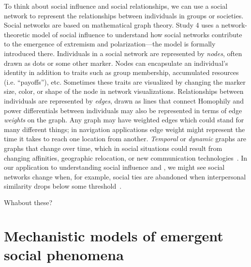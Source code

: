 \documentclass[12pt,letterpaper]{article}
\begin{document}
To think about social influence and social relationships, we can use a social 
network to represent the relationships between individuals
in groups or societies. 
Social networks are based on mathematical graph theory. Study 4 uses a network-theoretic
model of social influence to understand how social networks contribute to
the emergence of extremism and polarization---the model is formally 
introduced there. Individuals in a social network are represented by \emph{nodes},
often drawn as dots or some other marker. Nodes can encapsulate an individual's
identity in addition to traits such as group
membership, accumulated resources (i.e. ``payoffs''), etc. Sometimes these traits are visualized
by changing the marker size, color, or shape of the node in network visualizations.  Relationships
between individuals are represented by \emph{edges}, drawn as lines that connect
Homophily and power differentials between individuals 
may also be represented in terms of edge \emph{weights} on the graph. Any graph
may have weighted edges which could stand for many different things; in
navigation applications edge weight might represent the time it takes to reach 
one location from another. \emph{Temporal} or \emph{dynamic} graphs are graphs that change 
over time, which in social situations could result from changing affinities,
geographic relocation, or new communication technologies~\cite{Li2017}. 
In our application to understanding social influence and , we might see
social networks change when, for example, social ties are abandoned when interpersonal
similarity drops below some threshold~\cite{Axelrod1997,Hegselmann2002,Centola2007,Kossinets2009}.

Whabout these? \cite{Watts1999,Macy2003,Baldassarri2007, Flache2011,DellaPosta2015,Turner2018,Stewart2020b}

\section{Mechanistic models of emergent social phenomena}
\end{document}
